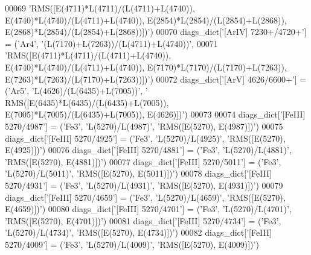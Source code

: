 \begin{DoxyCode}
00069               \textcolor{stringliteral}{'RMS([E(4711)*L(4711)/(L(4711)+L(4740)), E(4740)*L(4740)/(L(4711)+L(4740)),
       E(2854)*L(2854)/(L(2854)+L(2868)), E(2868)*L(2854)/(L(2854)+L(2868))])'})
00070 diags\_dict[\textcolor{stringliteral}{'[ArIV] 7230+/4720+'}] = (\textcolor{stringliteral}{'Ar4'}, \textcolor{stringliteral}{'(L(7170)+L(7263))/(L(4711)+L(4740))'},
00071               \textcolor{stringliteral}{'RMS([E(4711)*L(4711)/(L(4711)+L(4740)), E(4740)*L(4740)/(L(4711)+L(4740)),
       E(7170)*L(7170)/(L(7170)+L(7263)), E(7263)*L(7263)/(L(7170)+L(7263))])'})
00072 diags\_dict[\textcolor{stringliteral}{'[ArV] 4626/6600+'}] = (\textcolor{stringliteral}{'Ar5'}, \textcolor{stringliteral}{'L(4626)/(L(6435)+L(7005))'}, \textcolor{stringliteral}{'
      RMS([E(6435)*L(6435)/(L(6435)+L(7005)), E(7005)*L(7005)/(L(6435)+L(7005)), E(4626)])'})
00073 
00074 diags\_dict[\textcolor{stringliteral}{'[FeIII] 5270/4987'}] = (\textcolor{stringliteral}{'Fe3'}, \textcolor{stringliteral}{'L(5270)/L(4987)'}, \textcolor{stringliteral}{'RMS([E(5270), E(4987)])'})
00075 diags\_dict[\textcolor{stringliteral}{'[FeIII] 5270/4925'}] = (\textcolor{stringliteral}{'Fe3'}, \textcolor{stringliteral}{'L(5270)/L(4925)'}, \textcolor{stringliteral}{'RMS([E(5270), E(4925)])'})
00076 diags\_dict[\textcolor{stringliteral}{'[FeIII] 5270/4881'}] = (\textcolor{stringliteral}{'Fe3'}, \textcolor{stringliteral}{'L(5270)/L(4881)'}, \textcolor{stringliteral}{'RMS([E(5270), E(4881)])'})
00077 diags\_dict[\textcolor{stringliteral}{'[FeIII] 5270/5011'}] = (\textcolor{stringliteral}{'Fe3'}, \textcolor{stringliteral}{'L(5270)/L(5011)'}, \textcolor{stringliteral}{'RMS([E(5270), E(5011)])'})
00078 diags\_dict[\textcolor{stringliteral}{'[FeIII] 5270/4931'}] = (\textcolor{stringliteral}{'Fe3'}, \textcolor{stringliteral}{'L(5270)/L(4931)'}, \textcolor{stringliteral}{'RMS([E(5270), E(4931)])'})
00079 diags\_dict[\textcolor{stringliteral}{'[FeIII] 5270/4659'}] = (\textcolor{stringliteral}{'Fe3'}, \textcolor{stringliteral}{'L(5270)/L(4659)'}, \textcolor{stringliteral}{'RMS([E(5270), E(4659)])'})
00080 diags\_dict[\textcolor{stringliteral}{'[FeIII] 5270/4701'}] = (\textcolor{stringliteral}{'Fe3'}, \textcolor{stringliteral}{'L(5270)/L(4701)'}, \textcolor{stringliteral}{'RMS([E(5270), E(4701)])'})
00081 diags\_dict[\textcolor{stringliteral}{'[FeIII] 5270/4734'}] = (\textcolor{stringliteral}{'Fe3'}, \textcolor{stringliteral}{'L(5270)/L(4734)'}, \textcolor{stringliteral}{'RMS([E(5270), E(4734)])'})
00082 diags\_dict[\textcolor{stringliteral}{'[FeIII] 5270/4009'}] = (\textcolor{stringliteral}{'Fe3'}, \textcolor{stringliteral}{'L(5270)/L(4009)'}, \textcolor{stringliteral}{'RMS([E(5270), E(4009)])'})

\end{DoxyCode}
